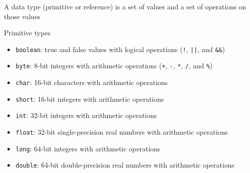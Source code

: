 \documentclass[8pt,a4paper,compress]{beamer}
\begin{document}
\begin{frame}[fragile]
\pause

A data type (primitive or reference) is a set of values and a set of operations on those values

\pause\bigskip

Primitive types
\begin{itemize}
\pause
\item \lstinline{boolean}: true and false values with logical operations (\lstinline{!}, \lstinline{||}, and \lstinline{&&})

\pause
\item \lstinline{byte}: 8-bit integers with arithmetic operations (\lstinline{+}, \lstinline{-}, \lstinline{*}, \lstinline{/}, and \lstinline{%})

\pause
\item \lstinline{char}: 16-bit characters with arithmetic operations 

\pause
\item \lstinline{short}: 16-bit integers with arithmetic operations

\pause
\item \lstinline{int}: 32-bit integers with arithmetic operations

\pause
\item \lstinline{float}: 32-bit single-precision real numbers with arithmetic operations

\pause
\item \lstinline{long}: 64-bit integers with arithmetic operations

\pause
\item \lstinline{double}: 64-bit double-precision real numbers with arithmetic operations
\end{itemize}
\end{frame}
\end{document}
